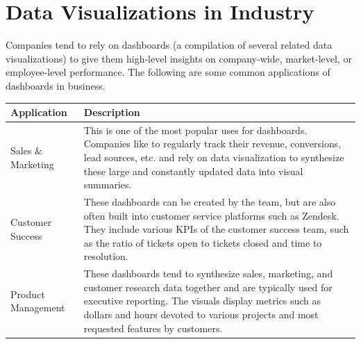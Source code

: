 \documentclass[]{book}
\theoremstyle{definition}
\theoremstyle{definition}
\theoremstyle{definition}
\theoremstyle{remark}
\begin{document}
\section{Data Visualizations in
Industry}\label{data-visualizations-in-industry}

Companies tend to rely on dashboards (a compilation of several related
data visualizations) to give them high-level insights on company-wide,
market-level, or employee-level performance. The following are some
common applications of dashboards in business.

\begin{longtable}[]{@{}ll@{}}
\toprule
\begin{minipage}[b]{0.16\columnwidth}\raggedright\strut
\textbf{Application}\strut
\end{minipage} & \begin{minipage}[b]{0.78\columnwidth}\raggedright\strut
\textbf{Description}\strut
\end{minipage}\tabularnewline
\midrule
\endhead
\begin{minipage}[t]{0.16\columnwidth}\raggedright\strut
Sales \& Marketing\strut
\end{minipage} & \begin{minipage}[t]{0.78\columnwidth}\raggedright\strut
This is one of the most popular uses for dashboards. Companies like to
regularly track their revenue, conversions, lead sources, etc. and rely
on data visualization to synthesize these large and constantly updated
data into visual summaries.\strut
\end{minipage}\tabularnewline
\begin{minipage}[t]{0.16\columnwidth}\raggedright\strut
Customer Success\strut
\end{minipage} & \begin{minipage}[t]{0.78\columnwidth}\raggedright\strut
These dashboards can be created by the team, but are also often built
into customer service platforms such as Zendesk. They include various
KPIs of the customer success team, such as the ratio of tickets open to
tickets closed and time to resolution.\strut
\end{minipage}\tabularnewline
\begin{minipage}[t]{0.16\columnwidth}\raggedright\strut
Product Management\strut
\end{minipage} & \begin{minipage}[t]{0.78\columnwidth}\raggedright\strut
These dashboards tend to synthesize sales, marketing, and customer
research data together and are typically used for executive reporting.
The visuals display metrics such as dollars and hours devoted to various
projects and most requested features by customers.\strut
\end{minipage}\tabularnewline
\bottomrule
\end{longtable}
\end{document}
